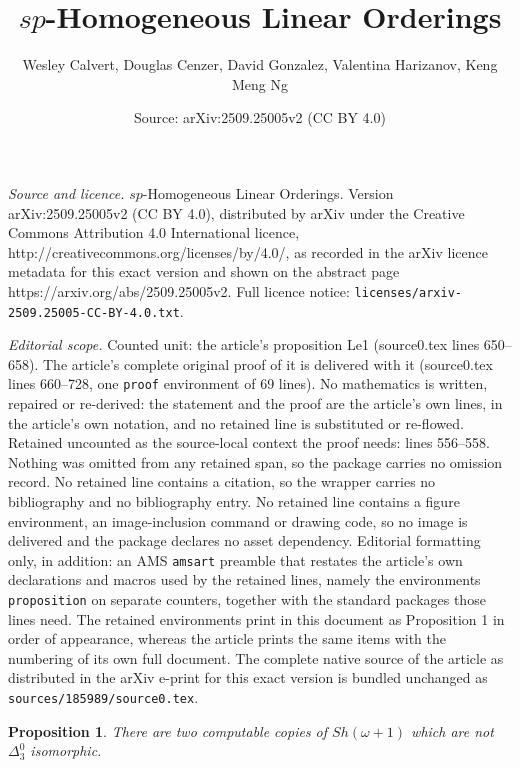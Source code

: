 \documentclass[10pt,a4paper]{amsart}
\title{$sp$-Homogeneous Linear Orderings}
\author{Wesley Calvert, Douglas Cenzer, David Gonzalez, Valentina Harizanov, Keng Meng Ng}
\date{Source: arXiv:2509.25005v2 (CC BY 4.0)}
\newtheorem{proposition}{Proposition}
\begin{document}
\maketitle

\noindent\emph{Source and licence.} $sp$-Homogeneous Linear Orderings. Version arXiv:2509.25005v2 (CC BY 4.0), distributed by arXiv under the Creative Commons Attribution 4.0 International licence, http://creativecommons.org/licenses/by/4.0/, as recorded in the arXiv licence metadata for this exact version and shown on the abstract page https://arxiv.org/abs/2509.25005v2. Full licence notice: \texttt{licenses/arxiv-2509.25005-CC-BY-4.0.txt}.\par\smallskip

\noindent\textit{Editorial scope.} Counted unit: the article's proposition Le1 (source0.tex lines 650--658). The article's complete original proof of it is delivered with it (source0.tex lines 660--728, one \texttt{proof} environment of 69 lines). No mathematics is written, repaired or re-derived: the statement and the proof are the article's own lines, in the article's own notation, and no retained line is substituted or re-flowed.  Retained uncounted as the source-local context the proof needs: lines 556--558.  Nothing was omitted from any retained span, so the package carries no omission record.  No retained line contains a citation, so the wrapper carries no bibliography and no bibliography entry.  No retained line contains a figure environment, an image-inclusion command or drawing code, so no image is delivered and the package declares no asset dependency.  Editorial formatting only, in addition: an AMS \texttt{amsart} preamble that restates the article's own declarations and macros used by the retained lines, namely the environments \texttt{proposition} on separate counters, together with the standard packages those lines need.  The retained environments print in this document as Proposition 1 in order of appearance, whereas the article prints the same items with the numbering of its own full document.  The complete native source of the article as distributed in the arXiv e-print for this exact version is bundled unchanged as \texttt{sources/185989/source0.tex}.
\begin{proposition} \label{shnotisom} 
There are two computable copies of $Sh(\omega + 1)$ which are not $\Delta^0_3$ isomorphic.
\end{proposition}
\end{document}
